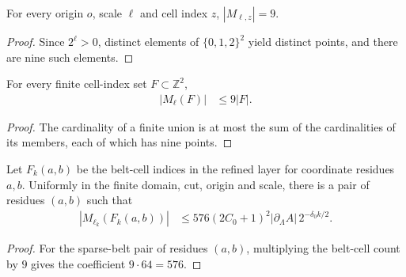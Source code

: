 \begin{lemma}
    \label{thm:area_law_belt_cell_mark_count}
    \leanok
    For every origin $o$, scale $\ell$ and cell index $z$, $|M_{\ell,z}|=9$.
\end{lemma}
\begin{proof}\leanok
    Since $2^\ell>0$, distinct elements of $\{0,1,2\}^2$ yield distinct points,
    and there are nine such elements.
\end{proof}

\begin{lemma}
    \label{thm:area_law_belt_mark_count}
    \leanok
    For every finite cell-index set $F\subset\mathbb Z^2$,
    \begin{align}
        |M_\ell(F)| & \le9|F|.
    \end{align}
\end{lemma}
\begin{proof}\leanok
    The cardinality of a finite union is at most the sum of the
    cardinalities of its members, each of which has nine points.
\end{proof}

\begin{lemma}
    \label{thm:area_law_sparse_belt_marks}
    \leanok
    Let $F_k(a,b)$ be the belt-cell indices in the refined
    layer for coordinate residues $a,b$. Uniformly in the finite domain, cut,
    origin and scale, there is a pair of residues $(a,b)$ such that
    \begin{align}
        |M_{\ell_k}(F_k(a,b))|
         & \le576(2C_0+1)^2|\partial_\Lambda A|\,2^{-\delta_0 k/2}.
    \end{align}
\end{lemma}
\begin{proof}\leanok
    For the sparse-belt pair of residues $(a,b)$, multiplying the belt-cell
    count by $9$ gives the coefficient $9\cdot64=576$.
\end{proof}
